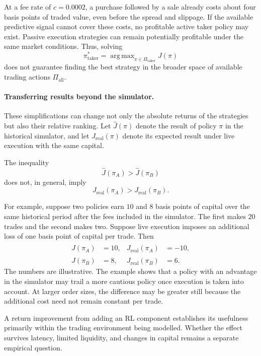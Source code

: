\documentclass[9pt,a4paper,twocolumn]{extarticle}
\DeclareMathOperator*{\argmax}{arg\,max}
\begin{document}
At a fee rate of $c=0.0002$, a purchase followed by a sale already costs about four basis points
of traded value, even before the spread and slippage. If the available predictive signal cannot
cover these costs, no profitable active taker policy may exist. Passive execution strategies can
remain potentially profitable under the same market conditions. Thus, solving
\[
    \pi^*_{\mathrm{taker}}
    =
    \argmax_{\pi\in\Pi_{\mathrm{taker}}}J(\pi)
\]
does not guarantee finding the best strategy in the broader space of available trading actions
$\Pi_{\mathrm{all}}$.

\paragraph{Transferring results beyond the simulator.}

These simplifications can change not only the absolute returns of the strategies but also their
relative ranking. Let $\widehat J(\pi)$ denote the result of policy $\pi$ in the historical
simulator, and let $J_{\mathrm{real}}(\pi)$ denote its expected result under live execution with
the same capital.

The inequality
\[
    \widehat J(\pi_A)>
    \widehat J(\pi_B)
\]
does not, in general, imply
\[
    J_{\mathrm{real}}(\pi_A)>
    J_{\mathrm{real}}(\pi_B).
\]

For example, suppose two policies earn $10$ and $8$ basis points of capital over the same
historical period after the fees included in the simulator. The first makes $20$ trades and the
second makes two. Suppose live execution imposes an additional loss of one basis point of
capital per trade. Then
\begin{equation}
    \begin{aligned}
      \widehat J(\pi_A)&=10,
      &J_{\mathrm{real}}(\pi_A)&=-10,\\
      \widehat J(\pi_B)&=8,
      &J_{\mathrm{real}}(\pi_B)&=6.
    \end{aligned}
    \label{eq:policy_ranking_reversal}
\end{equation}
The numbers are illustrative. The example shows that a policy with an advantage in the simulator
may trail a more cautious policy once execution is taken into account. At larger order sizes,
the difference may be greater still because the additional cost need not remain constant per
trade.

A return improvement from adding an RL component establishes its usefulness primarily within
the trading environment being modelled. Whether the effect survives latency, limited liquidity,
and changes in capital remains a separate empirical question.
\end{document}
